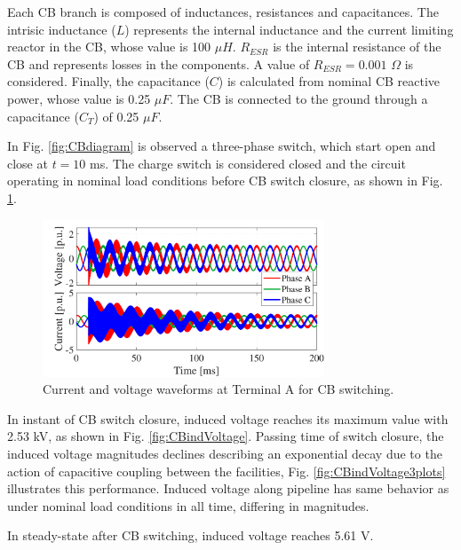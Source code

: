 \documentclass[5p,twocolumn]{elsarticle}
\begin{document}
Each CB branch is composed of inductances, resistances and capacitances. The intrisic inductance ($L$) represents the internal inductance and the current limiting reactor in the CB, whose value is 100 $\mu H$. $R_{ESR}$ is the internal resistance of the CB and represents losses in the components. A value of $R_{ESR} = 0.001$ $\Omega$ is considered. Finally, the capacitance ($C$) is calculated from nominal CB reactive power, whose value is 0.25 $\mu F$. The CB is connected to the ground through a capacitance ($C_{T}$) of 0.25 $\mu F$.

In Fig. \ref{fig:CBdiagram} is observed a three-phase switch, which start open and close at $t = 10$ ms. The charge switch is considered closed and the circuit operating in nominal load conditions before CB switch closure, as shown in Fig. \ref{fig:CBindVoltageTL}.

\begin{figure}[h]
	\begin{center}
		\includegraphics[width=8.4cm]{img/CBindVoltage_TL.pdf}    %
		\caption{Current and voltage waveforms at Terminal A for CB switching.} 
		\label{fig:CBindVoltageTL}
	\end{center}
\end{figure}

In instant of CB switch closure, induced voltage reaches its maximum value with 2.53 kV, as shown in Fig. \ref{fig:CBindVoltage}. Passing time of switch closure, the induced voltage magnitudes declines describing an exponential decay due to the action of capacitive coupling between the facilities, Fig. \ref{fig:CBindVoltage3plots} illustrates this performance. Induced voltage along pipeline has same behavior as under nominal load conditions in all time, differing in magnitudes. 

In steady-state after CB switching, induced voltage reaches 5.61 V.  
\end{document}
